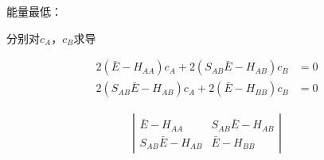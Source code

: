 能量最低：

分别对$c_A$，$c_B$求导


\begin{align*}
    2 \left(  \bar{E} - H_{AA}  \right)c_A + 2 \left( S_{AB} \bar{E} - H_{AB}  \right)c_B &= 0 \\
    2 \left(  S_{AB}\bar{E} - H_{AB} \right)c_A + 2 \left( \bar{E} - H_{BB}  \right)c_B &= 0
\end{align*}


\begin{align*}
    \left| \begin{array}{cc}
        \bar{E} - H_{AA} & S_{AB} \bar{E} - H_{AB} \\ 
        S_{AB} \bar{E} - H_{AB} & \bar{E} - H_{BB} 
    \end{array} \right|
\end{align*}



